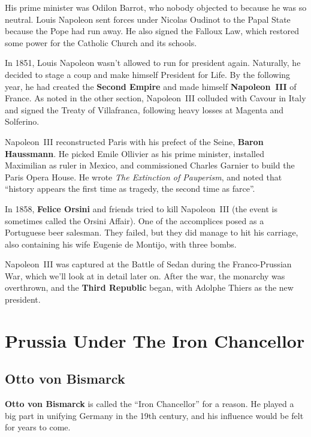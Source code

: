 His prime minister was Odilon Barrot, who nobody objected to because he was so neutral.
Louis Napoleon sent forces under Nicolas Oudinot to the Papal State because the Pope had run away.
He also signed the Falloux Law, which restored some power for the Catholic Church and its schools.

In 1851, Louis Napoleon wasn't allowed to run for president again.
Naturally, he decided to stage a coup and make himself President for Life.
By the following year,
he had created the \textbf{Second Empire} and made himself \textbf{Napoleon~III} of France.
As noted in the other section, Napoleon~III colluded with Cavour in Italy and signed the Treaty of Villafranca,
following heavy losses at Magenta and Solferino.

Napoleon~III reconstructed Paris with his prefect of the Seine, \textbf{Baron Haussmann}.
He picked Emile Ollivier as his prime minister,
installed Maximilian as ruler in Mexico,
and commissioned Charles Garnier to build the Paris Opera House.
He wrote \textit{The Extinction of Pauperism},
and noted that ``history appears the first time as tragedy, the second time as farce''.

In 1858, \textbf{Felice Orsini} and friends tried to kill Napoleon~III
(the event is sometimes called the Orsini Affair).
One of the accomplices posed as a Portuguese beer salesman.
They failed, but they did manage to hit his carriage, also containing his wife Eugenie de Montijo, with three bombs.

Napoleon~III was captured at the Battle of Sedan during the Franco-Prussian War,
which we'll look at in detail later on.
After the war, the monarchy was overthrown, and the \textbf{Third Republic} began,
with Adolphe Thiers as the new president.


\section{Prussia Under The Iron Chancellor}

\subsection*{Otto von Bismarck}

\textbf{Otto von Bismarck} is called the ``Iron Chancellor'' for a reason.
He played a big part in unifying Germany in the 19th century, and his influence would be felt for years to come.

